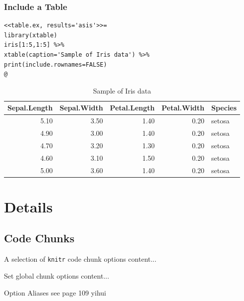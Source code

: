 \documentclass[10pt]{beamer}\usepackage[]{graphicx}\usepackage[]{color}
\makeatletter
\newenvironment{kframe}{%
 \def\at@end@of@kframe{}%
 \ifinner\ifhmode%
  \def\at@end@of@kframe{\end{minipage}}%
  \begin{minipage}{\columnwidth}%
 \fi\fi%
 \def\FrameCommand##1{\hskip\@totalleftmargin \hskip-\fboxsep
 \colorbox{shadecolor}{##1}\hskip-\fboxsep
     \hskip-\linewidth \hskip-\@totalleftmargin \hskip\columnwidth}%
 \MakeFramed {\advance\hsize-\width
   \@totalleftmargin\z@ \linewidth\hsize
   \@setminipage}}%
 {\par\unskip\endMakeFramed%
 \at@end@of@kframe}
\newenvironment{knitrout}{}{} %
\makeatother
\begin{document}
\begin{frame}[fragile]
\frametitle{Include a Table}
\scriptsize
\begin{knitrout}
\color{fgcolor}\begin{kframe}
\begin{verbatim}
<<table.ex, results='asis'>>=
library(xtable)
iris[1:5,1:5] %>% 
xtable(caption='Sample of Iris data') %>%
print(include.rownames=FALSE)
@
\end{verbatim}
\end{kframe}
\end{knitrout}
\begin{table}[ht]
\centering
\begin{tabular}{rrrrl}
  \hline
Sepal.Length & Sepal.Width & Petal.Length & Petal.Width & Species \\ 
  \hline
5.10 & 3.50 & 1.40 & 0.20 & setosa \\ 
  4.90 & 3.00 & 1.40 & 0.20 & setosa \\ 
  4.70 & 3.20 & 1.30 & 0.20 & setosa \\ 
  4.60 & 3.10 & 1.50 & 0.20 & setosa \\ 
  5.00 & 3.60 & 1.40 & 0.20 & setosa \\ 
   \hline
\end{tabular}
\caption{Sample of Iris data} 
\end{table}

\end{frame}



\section{Details}

\subsection{Code Chunks}

\begin{frame}{A selection of \texttt{knitr} code chunk options}
content...
\end{frame}


\begin{frame}{Set global chunk options}
content...
\end{frame}


\begin{frame}{Option Aliases}
see page 109 yihui
\end{frame}
\end{document}
